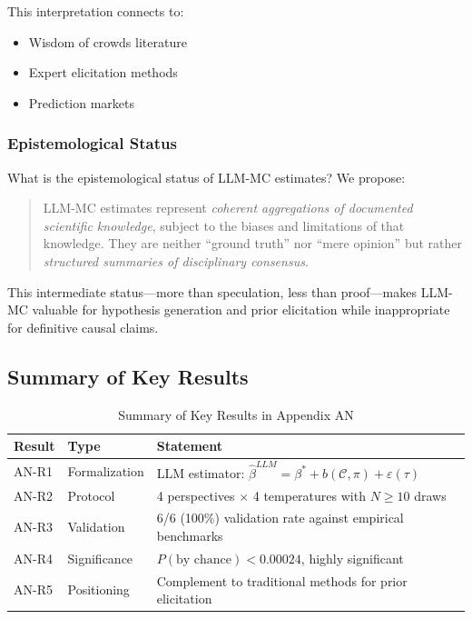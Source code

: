 This interpretation connects to:
\begin{itemize}
    \item Wisdom of crowds literature \citep{surowiecki2005wisdom}
    \item Expert elicitation methods \citep{ohaganelicitation}
    \item Prediction markets \citep{wolfers2004prediction}
\end{itemize}

\subsubsection{Epistemological Status}

What is the epistemological status of LLM-MC estimates? We propose:

\begin{quote}
LLM-MC estimates represent \textit{coherent aggregations of documented scientific knowledge}, subject to the biases and limitations of that knowledge. They are neither ``ground truth'' nor ``mere opinion'' but rather \textit{structured summaries of disciplinary consensus}.
\end{quote}

This intermediate status---more than speculation, less than proof---makes LLM-MC valuable for hypothesis generation and prior elicitation while inappropriate for definitive causal claims.



\subsection{Summary of Key Results}
\label{sec:AN-results}

\begin{table}[htbp]
\centering
\caption{Summary of Key Results in Appendix AN}
\label{tab:AN-results}
\renewcommand{\arraystretch}{1.2}
\begin{tabular}{@{}llp{7cm}@{}}
\toprule
\textbf{Result} & \textbf{Type} & \textbf{Statement} \\
\midrule
AN-R1 & Formalization & LLM estimator: $\hat{\beta}^{LLM} = \beta^* + b(\mathcal{C}, \pi) + \varepsilon(\tau)$ \\
AN-R2 & Protocol & 4 perspectives $\times$ 4 temperatures with $N \geq 10$ draws \\
AN-R3 & Validation & 6/6 (100\%) validation rate against empirical benchmarks \\
AN-R4 & Significance & $P(\text{by chance}) < 0.00024$, highly significant \\
AN-R5 & Positioning & Complement to traditional methods for prior elicitation \\
\bottomrule
\end{tabular}
\end{table}

